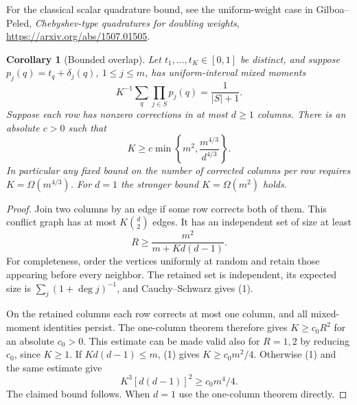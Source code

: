 \documentclass[11pt]{article}
\newtheorem{corollary}{Corollary}
\begin{document}
For the classical scalar quadrature bound, see the uniform-weight case
in Gilboa--Peled, \emph{Chebyshev-type quadratures for doubling weights},
\url{https://arxiv.org/abs/1507.01505}.
\begin{corollary}[Bounded overlap]
Let $t_1,\ldots,t_K\in[0,1]$ be distinct, and suppose
$p_j(q)=t_q+\delta_j(q)$, $1\le j\le m$, has uniform-interval mixed moments
\[
 K^{-1}\sum_q\prod_{j\in S}p_j(q)=\frac1{|S|+1}.
\]
Suppose each row has nonzero corrections in at most $d\ge1$ columns.
There is an absolute $c>0$ such that
\[
 K\ge c\min\left\{m^2,\frac{m^{4/3}}{d^{4/3}}\right\}.
\]
In particular any fixed bound on the number of corrected columns per
row requires $K=\Omega(m^{4/3})$. For $d=1$ the stronger bound
$K=\Omega(m^2)$ holds.
\end{corollary}
\begin{proof}
Join two columns by an edge if some row corrects both of them. This
conflict graph has at most $K\binom d2$ edges. It has an independent
set of size at least
\[
 R\ge\frac{m^2}{m+K d(d-1)}.
\tag{1}
\]
For completeness, order the vertices uniformly at random and retain
those appearing before every neighbor. The retained set is independent,
its expected size is $\sum_j(1+\deg j)^{-1}$, and Cauchy--Schwarz gives
(1).

On the retained columns each row corrects at most one column, and all
mixed-moment identities persist. The one-column theorem therefore gives
$K\ge c_0R^2$ for an absolute $c_0>0$. This estimate can be made valid
also for $R=1,2$ by reducing $c_0$, since $K\ge1$.
If $Kd(d-1)\le m$, (1) gives $K\ge c_0m^2/4$.
Otherwise (1) and the same estimate give
\[
 K^3[d(d-1)]^2\ge c_0m^4/4.
\]
The claimed bound follows. When $d=1$ use the one-column theorem directly.
\end{proof}
\end{document}
